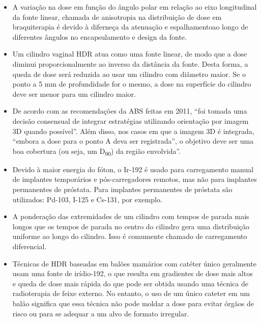 \documentclass[11pt,a4paper]{article}
\newcounter{exemplo}
\begin{document}
\begin{exemplo}[Braquiterapia]
    \begin{itemize}
        \item A variação na dose em função do ângulo polar em relação ao eixo longitudinal da fonte linear, chamada de anisotropia na distribuição de dose em braquiterapia é devido à  diferneça da atenuação e espalhamentoao longo de diferentes ângulos no encapsulamento e design da fonte.
        
        \item Um cilindro vaginal HDR atua como uma fonte linear, de modo que a dose diminui proporcionalmente ao inverso da distância da fonte. Desta forma, a queda de dose será reduzida ao usar um cilindro com diâmetro maior. Se o ponto a 5 mm de profundidade for o mesmo, a dose na superfície do cilindro deve ser menor para um cilindro maior.
        
        \item De acordo com as recomendações da ABS feitas em 2011, “foi tomada uma decisão consensual de integrar estratégias utilizando orientação por imagem 3D quando possível”. Além disso, nos casos em que a imagem 3D é integrada, ``embora a dose para o ponto A deva ser registrada'', o objetivo deve ser uma boa cobertura (ou seja, um D\textsubscript{90}) da região envolvida”.
        
        \item Devido à maior energia do fóton, o Ir-192 é usado para carregamento manual de implantes temporários e pós-carregadores remotos, mas não para implantes permanentes de próstata. Para implantes permanentes de próstata são utilizados: Pd-103, I-125 e Cs-131, por exemplo.
        
        \item A ponderação das extremidades de um cilindro com tempos de parada mais longos que os tempos de parada no centro do cilindro gera uma distribuição uniforme ao longo do cilindro. Isso é comumente chamado de carregamento diferencial.
        
        \item Técnicas de HDR baseadas em balões mamários com catéter único geralmente usam uma fonte de irídio-192, o que resulta em gradientes de dose mais altos e queda de dose mais rápida do que pode ser obtida usando uma técnica de radioterapia de feixe externo. No entanto, o uso de um único cateter em um balão significa que essa técnica não pode moldar a dose para evitar órgãos de risco ou para se adequar a um alvo de formato irregular.
        

\end{itemize}
\end{exemplo}
\end{document}
